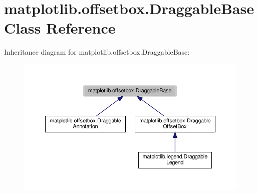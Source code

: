 \hypertarget{classmatplotlib_1_1offsetbox_1_1DraggableBase}{}\section{matplotlib.\+offsetbox.\+Draggable\+Base Class Reference}
\label{classmatplotlib_1_1offsetbox_1_1DraggableBase}


Inheritance diagram for matplotlib.\+offsetbox.\+Draggable\+Base\+:
\nopagebreak
\begin{figure}[H]
\begin{center}
\leavevmode
\includegraphics[width=350pt]{classmatplotlib_1_1offsetbox_1_1DraggableBase__inherit__graph}
\end{center}
\end{figure}
